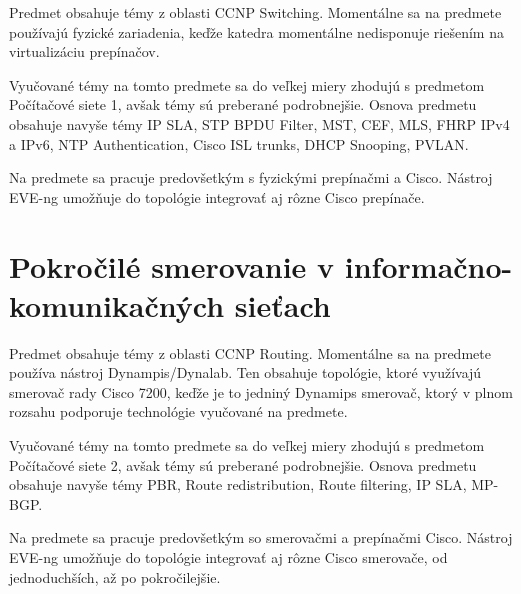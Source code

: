Predmet obsahuje témy z oblasti CCNP Switching. Momentálne sa na predmete používajú fyzické zariadenia, keďže katedra momentálne nedisponuje riešením na virtualizáciu prepínačov.

Vyučované témy na tomto predmete sa do veľkej miery zhodujú s predmetom Počítačové siete 1, avšak témy sú preberané podrobnejšie. Osnova predmetu obsahuje navyše témy IP SLA, STP BPDU Filter, MST, CEF, MLS, FHRP IPv4 a IPv6, NTP Authentication, Cisco ISL trunks, DHCP Snooping, PVLAN.

Na predmete sa pracuje predovšetkým s fyzickými prepínačmi a Cisco. Nástroj EVE-ng umožňuje do topológie integrovať aj rôzne Cisco prepínače.





\section{Pokročilé smerovanie v informačno-komunikačných sieťach}

Predmet obsahuje témy z oblasti CCNP Routing. Momentálne sa na predmete používa nástroj Dynampis/Dynalab. Ten obsahuje topológie, ktoré využívajú smerovač rady Cisco 7200, keďže je to jedniný Dynamips smerovač, ktorý v plnom rozsahu podporuje technológie vyučované na predmete.

Vyučované témy na tomto predmete sa do veľkej miery zhodujú s predmetom Počítačové siete 2, avšak témy sú preberané podrobnejšie. Osnova predmetu obsahuje navyše témy PBR, Route redistribution, Route filtering, IP SLA, MP-BGP.

Na predmete sa pracuje predovšetkým so smerovačmi a prepínačmi Cisco. Nástroj EVE-ng umožňuje do topológie integrovať aj rôzne Cisco smerovače, od jednoduchších, až po pokročilejšie.